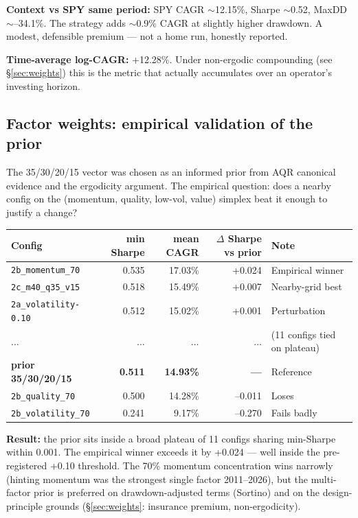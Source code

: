 \documentclass[11pt,a4paper]{article}
\begin{document}
\textbf{Context vs SPY same period:} SPY CAGR $\sim$12.15\%, Sharpe $\sim$0.52, MaxDD $\sim$--34.1\%. The strategy adds $\sim$0.9\% CAGR at slightly higher drawdown. A modest, defensible premium --- not a home run, honestly reported.

\textbf{Time-average log-CAGR:} +12.28\%. Under non-ergodic compounding (see \S\ref{sec:weights}) this is the metric that actually accumulates over an operator's investing horizon.

\subsection{Factor weights: empirical validation of the prior}

The 35/30/20/15 vector was chosen as an informed prior from AQR canonical evidence and the ergodicity argument. The empirical question: does a nearby config on the (momentum, quality, low-vol, value) simplex beat it enough to justify a change?

\begin{table}[H]
\centering
\renewcommand{\arraystretch}{1.3}
\begin{tabular}{lrrrl}
\toprule
Config & min Sharpe & mean CAGR & $\Delta$ Sharpe vs prior & Note \\
\midrule
\texttt{2b\_momentum\_70} & 0.535 & 17.03\% & +0.024 & Empirical winner \\
\texttt{2c\_m40\_q35\_v15} & 0.518 & 15.49\% & +0.007 & Nearby-grid best \\
\texttt{2a\_volatility-0.10} & 0.512 & 15.02\% & +0.001 & Perturbation \\
$\ldots$ & $\ldots$ & $\ldots$ & $\ldots$ & (11 configs tied on plateau) \\
\textbf{prior 35/30/20/15} & \textbf{0.511} & \textbf{14.93\%} & \textbf{---} & Reference \\
\texttt{2b\_quality\_70} & 0.500 & 14.28\% & --0.011 & Loses \\
\texttt{2b\_volatility\_70} & 0.241 & 9.17\% & --0.270 & Fails badly \\
\bottomrule
\end{tabular}
\end{table}

\textbf{Result:} the prior sits inside a broad plateau of 11 configs sharing min-Sharpe within 0.001. The empirical winner exceeds it by +0.024 --- well inside the pre-registered +0.10 threshold. The 70\% momentum concentration wins narrowly (hinting momentum was the strongest single factor 2011--2026), but the multi-factor prior is preferred on drawdown-adjusted terms (Sortino) and on the design-principle grounds (\S\ref{sec:weights}: insurance premium, non-ergodicity).
\end{document}
